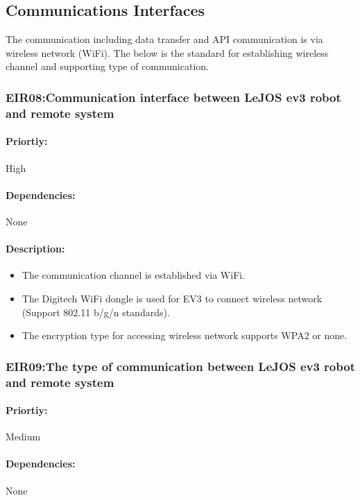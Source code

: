 \documentclass[10pt,a4paper,titlepage]{article}
\begin{document}
	\subsection{Communications Interfaces}
	The communication including data transfer and API communication is via wireless network (WiFi). The below is the standard for establishing wireless channel and supporting type of communication.
	
	\subsubsection*{EIR08:Communication interface between LeJOS ev3 robot and remote system }
	\paragraph{Priortiy:} High
	\paragraph{Dependencies:} None	
	\paragraph{Description:}
	\begin{itemize}
		\item The communication channel is established via WiFi.
		\item The Digitech WiFi dongle is used for EV3 to connect wireless network (Support 802.11 b/g/n standards).
		\item The encryption type for accessing wireless network supports WPA2 or none.
	\end{itemize}
	
	\subsubsection*{EIR09:The type of communication between LeJOS ev3 robot and remote system}
	\paragraph{Priortiy:} Medium
	\paragraph{Dependencies:} None	
\end{document}
